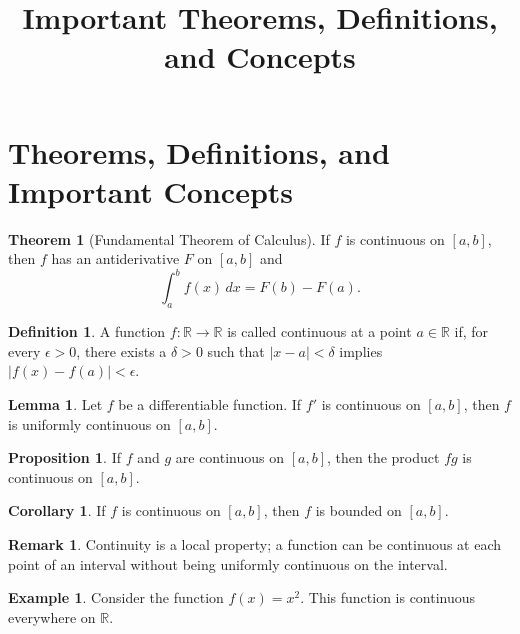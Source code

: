\documentclass{article}
\title{Important Theorems, Definitions, and Concepts}
\author{}
\date{}
\begin{document}
\maketitle

\theoremstyle{definition}
\newtheorem{definition}{Definition}[section]
\newtheorem{theorem}{Theorem}[section]
\newtheorem{lemma}{Lemma}[section]
\newtheorem{proposition}{Proposition}[section]
\newtheorem{corollary}{Corollary}[section]
\newtheorem{remark}{Remark}[section]
\newtheorem{example}{Example}[section]

\section{Theorems, Definitions, and Important Concepts}

\begin{theorem}[Fundamental Theorem of Calculus]
If \( f \) is continuous on \([a, b]\), then \( f \) has an antiderivative \( F \) on \([a, b]\) and
\[
\int_a^b f(x) \, dx = F(b) - F(a).
\]
\end{theorem}

\begin{definition}
A function \( f : \mathbb{R} \to \mathbb{R} \) is called continuous at a point \( a \in \mathbb{R} \) if, for every \(\epsilon > 0\), there exists a \(\delta > 0\) such that \(|x - a| < \delta\) implies \(|f(x) - f(a)| < \epsilon\).
\end{definition}

\begin{lemma}
Let \( f \) be a differentiable function. If \( f' \) is continuous on \([a, b]\), then \( f \) is uniformly continuous on \([a, b]\).
\end{lemma}

\begin{proposition}
If \( f \) and \( g \) are continuous on \([a, b]\), then the product \( fg \) is continuous on \([a, b]\).
\end{proposition}

\begin{corollary}
If \( f \) is continuous on \([a, b]\), then \( f \) is bounded on \([a, b]\).
\end{corollary}

\begin{remark}
Continuity is a local property; a function can be continuous at each point of an interval without being uniformly continuous on the interval.
\end{remark}

\begin{example}
Consider the function \( f(x) = x^2 \). This function is continuous everywhere on \(\mathbb{R}\).
\end{example}

\end{document}
